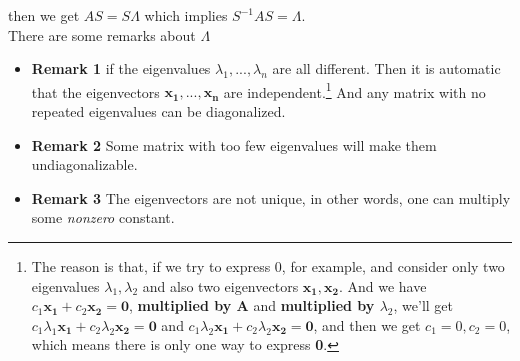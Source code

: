 \documentclass[12pt]{article}
\begin{document}
then we get $AS = S\Lambda$ which implies $S^{-1}AS = \Lambda$.
\\
There are some remarks about $\Lambda$

\begin{itemize}
    \item \textbf{Remark 1} if the eigenvalues $\lambda_1, ..., \lambda_n$ are all different. Then it is automatic that the eigenvectors $\mathbf{x_1, ..., x_n}$ are independent.\footnote{The reason is that, if we try to express 0, for example, and consider only two eigenvalues $\lambda_1, \lambda_2$ and also two eigenvectors $\mathbf{x_1, x_2}$. And we have $c_1\mathbf{x_1}+c_2\mathbf{x_2} = \mathbf{0}$, \textbf{multiplied by A} and \textbf{multiplied by $\lambda_2$}, we'll get $c_1\lambda_1\mathbf{x_1} + c_2\lambda_2\mathbf{x_2} = \mathbf{0}$ and $c_1\lambda_2\mathbf{x_1} + c_2\lambda_2\mathbf{x_2} = \mathbf{0}$, and then we get $c_1 = 0, c_2 = 0$, which means there is only one way to express \textbf{0}.} And any matrix with no repeated eigenvalues can be diagonalized.
    \item \textbf{Remark 2} Some matrix with too few eigenvalues will make them undiagonalizable.
    \item \textbf{Remark 3} The eigenvectors are not unique, in other words, one can multiply some \textit{nonzero} constant.
\end{itemize}
\end{document}
